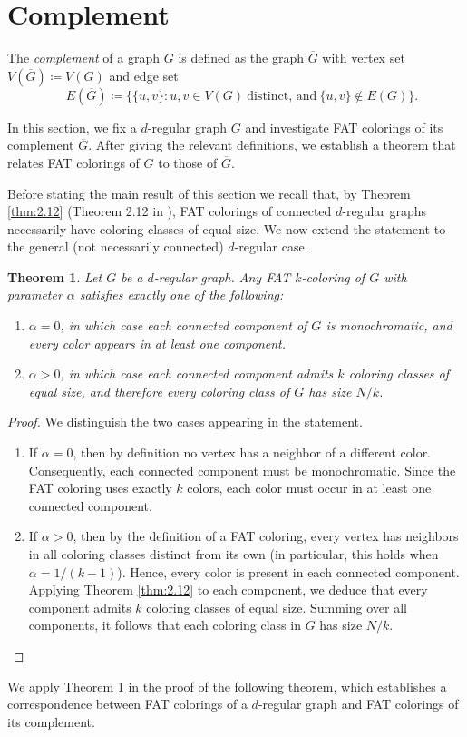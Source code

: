 \documentclass{article}
\theoremstyle{plain}
\newtheorem{theorem}{Theorem}[section]
\theoremstyle{definition}
\theoremstyle{remark}
\begin{document}
\section{Complement}\label{sec:comp}


The \emph{complement} of a graph $G$ is defined as the graph $\overline{G}$ with vertex set $V(\overline{G})\coloneqq V(G)$ and edge set
\[
\quad 
E(\overline G)\coloneqq \bigl\{\{u,v\}\colon u,v\in V(G)\ \text{distinct, and}\ \{u,v\}\notin E(G)\bigr\}.
\]

In this section, we fix a $d$-regular graph $G$ and investigate FAT colorings of its complement $\overline{G}$. After giving the relevant definitions, we establish a theorem that relates FAT colorings of $G$ to those of $\overline{G}$.


Before stating the main result of this section we recall that, by Theorem \ref{thm:2.12} (Theorem 2.12 in \cite{beersmulasFAT}), FAT colorings of connected $d$-regular graphs necessarily have coloring classes of equal size. We now extend the statement to the general (not necessarily connected) $d$-regular case.

\begin{theorem}\label{thm:FATreggen}
    Let $G$ be a $d$-regular graph. Any FAT $k$-coloring of $G$ with parameter $\alpha$ satisfies exactly one of the following:
    \begin{enumerate}
        \item $\alpha = 0$, in which case each connected component of $G$ is monochromatic, and every color appears in at least one component.
        \item $\alpha > 0$, in which case each connected component admits $k$ coloring classes of equal size, and therefore every coloring class of $G$ has size $N/k$.
    \end{enumerate}
\end{theorem}
\begin{proof}
    We distinguish the two cases appearing in the statement.
    \begin{enumerate}
        \item If $\alpha = 0$, then by definition no vertex has a neighbor of a different color. Consequently, each connected component must be monochromatic. Since the FAT coloring uses exactly $k$ colors, each color must occur in at least one connected component.
        \item If $\alpha > 0$, then by the definition of a FAT coloring, every vertex has neighbors in all coloring classes distinct from its own (in particular, this holds when $\alpha = 1/(k-1)$). Hence, every color is present in each connected component. Applying Theorem \ref{thm:2.12} to each component, we deduce that every component admits $k$ coloring classes of equal size. Summing over all components, it follows that each coloring class in $G$ has size $N/k$. \qedhere
    \end{enumerate}
\end{proof}
We apply Theorem \ref{thm:FATreggen} in the proof of the following theorem, which establishes a correspondence between FAT colorings of a $d$‑regular graph and FAT colorings of its complement.
\end{document}
